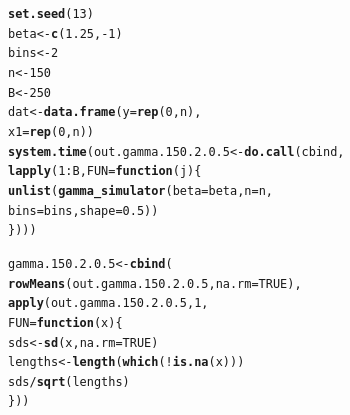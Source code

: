 \documentclass[11pt]{article}\usepackage[]{graphicx}\usepackage[]{color}
\makeatletter
\newcommand{\hlnum}[1]{\textcolor[rgb]{0.686,0.059,0.569}{#1}}%
\newcommand{\hlopt}[1]{\textcolor[rgb]{0,0,0}{#1}}%
\newcommand{\hlstd}[1]{\textcolor[rgb]{0.345,0.345,0.345}{#1}}%
\newcommand{\hlkwa}[1]{\textcolor[rgb]{0.161,0.373,0.58}{\textbf{#1}}}%
\newcommand{\hlkwb}[1]{\textcolor[rgb]{0.69,0.353,0.396}{#1}}%
\newcommand{\hlkwc}[1]{\textcolor[rgb]{0.333,0.667,0.333}{#1}}%
\newcommand{\hlkwd}[1]{\textcolor[rgb]{0.737,0.353,0.396}{\textbf{#1}}}%
\newenvironment{kframe}{%
 \def\at@end@of@kframe{}%
 \ifinner\ifhmode%
  \def\at@end@of@kframe{\end{minipage}}%
  \begin{minipage}{\columnwidth}%
 \fi\fi%
 \def\FrameCommand##1{\hskip\@totalleftmargin \hskip-\fboxsep
 \colorbox{shadecolor}{##1}\hskip-\fboxsep
     \hskip-\linewidth \hskip-\@totalleftmargin \hskip\columnwidth}%
 \MakeFramed {\advance\hsize-\width
   \@totalleftmargin\z@ \linewidth\hsize
   \@setminipage}}%
 {\par\unskip\endMakeFramed%
 \at@end@of@kframe}
\newenvironment{knitrout}{}{} %
\makeatother
\begin{document}
\begin{knitrout}
\color{fgcolor}\begin{kframe}
\begin{alltt}
\hlkwd{set.seed}\hlstd{(}\hlnum{13}\hlstd{)}
\hlstd{beta} \hlkwb{<-} \hlkwd{c}\hlstd{(}\hlnum{1.25}\hlstd{,} \hlopt{-}\hlnum{1}\hlstd{)}
\hlstd{bins} \hlkwb{<-} \hlnum{2}
\hlstd{n} \hlkwb{<-} \hlnum{150}
\hlstd{B} \hlkwb{<-} \hlnum{250}
\hlstd{dat} \hlkwb{<-} \hlkwd{data.frame}\hlstd{(}\hlkwc{y} \hlstd{=} \hlkwd{rep}\hlstd{(}\hlnum{0}\hlstd{, n),}
  \hlkwc{x1} \hlstd{=} \hlkwd{rep}\hlstd{(}\hlnum{0}\hlstd{, n))}
\hlkwd{system.time}\hlstd{(out.gamma.150.2.0.5} \hlkwb{<-} \hlkwd{do.call}\hlstd{(cbind,}
  \hlkwd{lapply}\hlstd{(}\hlnum{1}\hlopt{:}\hlstd{B,} \hlkwc{FUN} \hlstd{=} \hlkwa{function}\hlstd{(}\hlkwc{j}\hlstd{)\{}
    \hlkwd{unlist}\hlstd{(}\hlkwd{gamma_simulator}\hlstd{(}\hlkwc{beta} \hlstd{= beta,} \hlkwc{n} \hlstd{= n,}
      \hlkwc{bins} \hlstd{= bins,} \hlkwc{shape} \hlstd{=} \hlnum{0.5}\hlstd{))}
\hlstd{\})))}
\end{alltt}


{\ttfamily\noindent\bfseries\color{errorcolor}{\#\# Error in eval(family\$initialize): non-positive values not allowed for the 'gamma' family}}

{\ttfamily\noindent\itshape\color{messagecolor}{\#\# Timing stopped at: 0.109 0.016 0.124}}\end{kframe}
\end{knitrout}

\begin{knitrout}
\color{fgcolor}\begin{kframe}
\begin{alltt}
\hlstd{gamma.150.2.0.5} \hlkwb{<-} \hlkwd{cbind}\hlstd{(}
  \hlkwd{rowMeans}\hlstd{(out.gamma.150.2.0.5,} \hlkwc{na.rm} \hlstd{=} \hlnum{TRUE}\hlstd{),}
  \hlkwd{apply}\hlstd{(out.gamma.150.2.0.5,} \hlnum{1}\hlstd{,}
  \hlkwc{FUN} \hlstd{=} \hlkwa{function}\hlstd{(}\hlkwc{x}\hlstd{)\{}
    \hlstd{sds} \hlkwb{<-} \hlkwd{sd}\hlstd{(x,} \hlkwc{na.rm} \hlstd{=} \hlnum{TRUE}\hlstd{)}
    \hlstd{lengths} \hlkwb{<-} \hlkwd{length}\hlstd{(}\hlkwd{which}\hlstd{(}\hlopt{!}\hlkwd{is.na}\hlstd{(x)))}
    \hlstd{sds} \hlopt{/} \hlkwd{sqrt}\hlstd{(lengths)}
  \hlstd{\}))}
\end{alltt}


{\ttfamily\noindent\bfseries\color{errorcolor}{\#\# Error in is.data.frame(x): object 'out.gamma.150.2.0.5' not found}}\end{kframe}
\end{knitrout}
\end{document}
